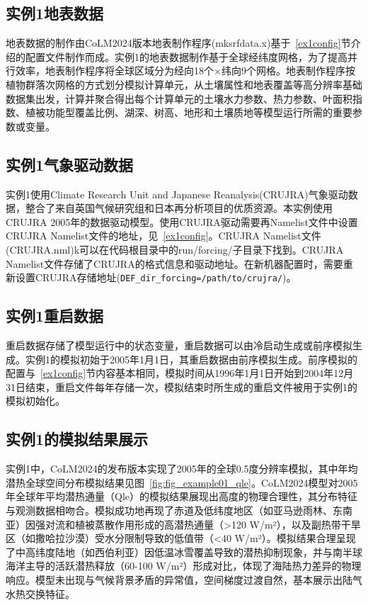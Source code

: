 \subsection{实例1地表数据}

地表数据的制作由CoLM2024版本地表制作程序(mksrfdata.x)基于~\ref{ex1config}节介绍的配置文件制作而成。实例1的地表数据制作基于全球经纬度网格，为了提高并行效率，地表制作程序将全球区域分为经向18个$\times$纬向9个网格。地表制作程序按植物群落次网格的方式划分模拟计算单元，从土壤属性和地表覆盖等高分辨率基础数据集出发，计算并聚合得出每个计算单元的土壤水力参数、热力参数、叶面积指数、植被功能型覆盖比例、湖深、树高、地形和土壤质地等模型运行所需的重要参数或变量。

\subsection{实例1气象驱动数据}

实例1使用Climate Research Unit and Japanese Reanalysis(CRUJRA)气象驱动数据，整合了来自英国气候研究组和日本再分析项目的优质资源。本实例使用CRUJRA 2005年的数据驱动模型。使用CRUJRA驱动需要再Namelist文件中设置CRUJRA Namelist文件的地址，见~\ref{ex1config}。CRUJRA Namelist文件(CRUJRA.nml)k可以在代码根目录中的run/forcing/子目录下找到。CRUJRA Namelist文件存储了CRUJRA的格式信息和驱动地址。在新机器配置时，需要重新设置CRUJRA存储地址(\texttt{DEF\_dir\_forcing=/path/to/crujra/})。

\subsection{实例1重启数据}

重启数据存储了模型运行中的状态变量，重启数据可以由冷启动生成或前序模拟生成。实例1的模拟初始于2005年1月1日，其重启数据由前序模拟生成。前序模拟的配置与~\ref{ex1config}节内容基本相同，模拟时间从1996年1月1日开始到2004年12月31日结束，重启文件每年存储一次，模拟结束时所生成的重启文件被用于实例1的模拟初始化。

\subsection{实例1的模拟结果展示}

实例1中，CoLM2024的发布版本实现了2005年的全球0.5度分辨率模拟，其中年均潜热全球空间分布模拟结果见图~\ref{fig:fig_example01_qle}。CoLM2024模型对2005年全球年平均潜热通量（Qle）的模拟结果展现出高度的物理合理性，其分布特征与观测数据相吻合。模拟成功地再现了赤道及低纬度地区（如亚马逊雨林、东南亚）因强对流和植被蒸散作用形成的高潜热通量（>120 W/m²），以及副热带干旱区（如撒哈拉沙漠）受水分限制导致的低值带（<40 W/m²）。模拟结果合理呈现了中高纬度陆地（如西伯利亚）因低温冰雪覆盖导致的潜热抑制现象，并与南半球海洋主导的活跃潜热释放（60-100 W/m²）形成对比，体现了海陆热力差异的物理响应。模型未出现与气候背景矛盾的异常值，空间梯度过渡自然，基本展示出陆气水热交换特征。

